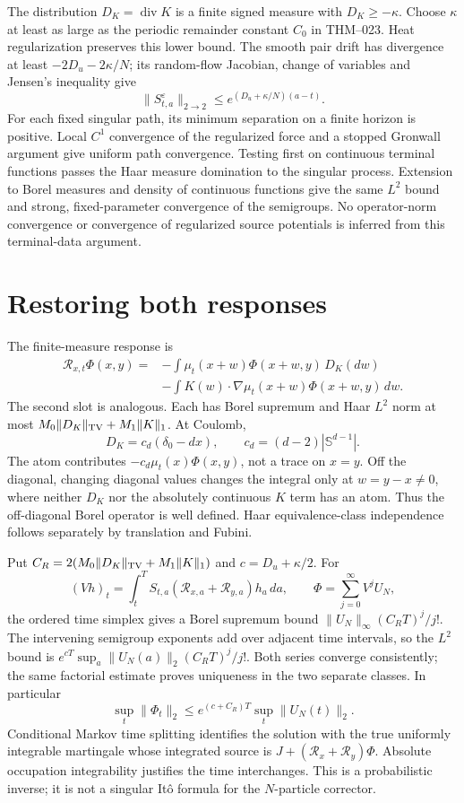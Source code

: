 \documentclass[10pt]{article}
\newcommand{\R}{\mathcal R}
\newcommand{\norm}[1]{\lVert #1\rVert}
\begin{document}
The distribution $D_K=\operatorname{div}K$ is a finite signed measure with
$D_K\ge-\kappa$. Choose $\kappa$ at least as large as the periodic remainder
constant $C_0$ in THM--023. Heat regularization preserves this lower bound. The smooth
pair drift has divergence at least $-2D_u-2\kappa/N$; its random-flow Jacobian,
change of variables and Jensen's inequality give
\[
 \norm{S^{\varepsilon}_{t,a}}_{2\to2}
 \le e^{(D_u+\kappa/N)(a-t)}.
\]
For each fixed singular path, its minimum separation on a finite horizon is
positive. Local $C^1$ convergence of the regularized force and a stopped
Gronwall argument give uniform path convergence. Testing first on continuous
terminal functions passes the Haar measure domination to the singular process.
Extension to Borel measures and density of continuous functions give the same
$L^2$ bound and strong, fixed-parameter convergence of the semigroups.
No operator-norm convergence or convergence of regularized source potentials
is inferred from this terminal-data argument.

\section*{Restoring both responses}
The finite-measure response is
\begin{align*}
 \R_{x,t}\Phi(x,y)
 ={}&-\int\mu_t(x+w)\Phi(x+w,y)\,D_K(dw)\\
    &-\int K(w)\cdot\nabla\mu_t(x+w)\Phi(x+w,y)\,dw.
\end{align*}
The second slot is analogous. Each has Borel supremum and Haar $L^2$ norm
at most $M_0\norm{D_K}_{\rm TV}+M_1\norm K_1$. At Coulomb,
\[
 D_K=c_d(\delta_0-dx),\qquad c_d=(d-2)|\mathbb S^{d-1}|.
\]
The atom contributes $-c_d\mu_t(x)\Phi(x,y)$, not a trace on $x=y$.
Off the diagonal, changing diagonal values changes the integral only at
$w=y-x\ne0$, where neither $D_K$ nor the absolutely continuous $K$ term
has an atom. Thus the off-diagonal Borel operator is well defined. Haar
equivalence-class independence follows separately by translation and Fubini.

Put $C_R=2(M_0\norm{D_K}_{\rm TV}+M_1\norm K_1)$ and
$c=D_u+\kappa/2$. For
\[
 (Vh)_t=\int_t^T S_{t,a}(\R_{x,a}+\R_{y,a})h_a\,da,
 \qquad \Phi=\sum_{j=0}^{\infty}V^jU_N,
\]
the ordered time simplex gives a Borel supremum bound
$\norm{U_N}_\infty(C_RT)^j/j!$. The intervening semigroup exponents add
over adjacent time intervals, so the $L^2$ bound is
$e^{cT}\sup_a\norm{U_N(a)}_2(C_RT)^j/j!$. Both series converge consistently;
the same factorial estimate proves uniqueness in the two separate classes.
In particular
\[
 \sup_t\norm{\Phi_t}_2\le e^{(c+C_R)T}\sup_t\norm{U_N(t)}_2.
\]
Conditional Markov time splitting identifies the solution with the true
uniformly integrable martingale whose integrated source is
$J+(\R_x+\R_y)\Phi$. Absolute occupation integrability justifies the time
interchanges. This is a probabilistic inverse; it is not a singular It\^o
formula for the $N$-particle corrector.
\end{document}
